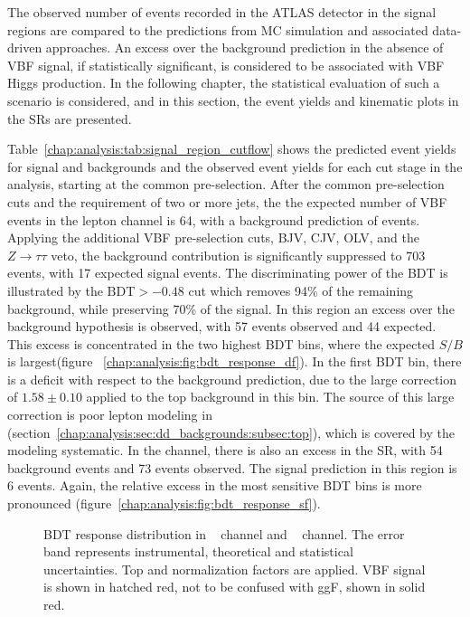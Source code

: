 
The observed number of events recorded in the ATLAS detector in the
signal regions are compared to the
predictions from MC simulation and associated data-driven
approaches. An excess over the background prediction in the absence
of VBF signal, if statistically significant, is considered to be
associated with VBF Higgs production. In the following chapter, the
statistical evaluation of such a scenario is considered, and in this
section, the event yields and kinematic plots in the SRs are presented. 

Table~\ref{chap:analysis:tab:signal_region_cutflow} shows the
predicted event yields for signal and backgrounds and the observed
event yields for each cut stage in the analysis, starting at the
common pre-selection. After the common pre-selection cuts and the
requirement of two or more jets, the the expected number of VBF events in
the \emme lepton channel is 64, with a background prediction of
 events. Applying the additional VBF pre-selection
cuts, BJV, CJV, OLV, and the $Z\rightarrow{\tau\tau}$ veto, the
background contribution is significantly suppressed to 703 events,
with 17 expected signal events. The discriminating power of the BDT is
illustrated by the $\textrm{BDT} > -0.48$ cut which removes 94\% of
the remaining background, while preserving 70\% of the signal. In this
region an excess over the background hypothesis is observed, with 57
events observed and 44 expected. This excess is concentrated in the
two highest BDT bins, where the expected $S/B$ is
largest(figure ~\ref{chap:analysis:fig:bdt_response_df}). In the
first BDT bin, there is a deficit with respect to the background
prediction, due to the large correction of $1.58 \pm 0.10$ applied to
the top background in this bin. The source of this large correction is
poor lepton modeling in \POWHEG
(section~\ref{chap:analysis:sec:dd_backgrounds:subsec:top}), which is
covered by the modeling systematic. In the \eemm channel, there is
also an excess in the SR, with 54 background events and 73 events
observed. The signal prediction in this region is 6 events. Again, the
relative excess in the most sensitive BDT bins is more pronounced
(figure~\ref{chap:analysis:fig:bdt_response_sf}). 

\begin{figure}[h]
    \centering
    \caption[BDT response distributions.]{BDT response distribution in
    ~ \emme channel and
    ~ \eemm channel. The
    error band represents instrumental, theoretical and statistical
    uncertainties. Top and \ZDY normalization factors are applied. VBF
    signal is shown in hatched red, not to be confused with ggF, shown
    in solid red.}
\label{chap:analysis:fig:bdt_response}
\end{figure}

